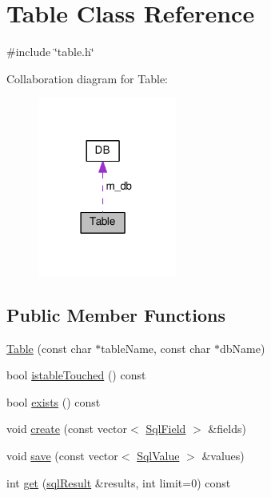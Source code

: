 \hypertarget{classTable}{}\section{Table Class Reference}
\label{classTable}


{\ttfamily \#include \char`\"{}table.\+h\char`\"{}}



Collaboration diagram for Table\+:\nopagebreak
\begin{figure}[H]
\begin{center}
\leavevmode
\includegraphics[width=129pt]{classTable__coll__graph}
\end{center}
\end{figure}
\subsection*{Public Member Functions}
\begin{DoxyCompactItemize}
\item 
\mbox{\hyperlink{classTable_ae35623804222a53627bdcaa9e180640f}{Table}} (const char $\ast$table\+Name, const char $\ast$db\+Name)
\item 
bool \mbox{\hyperlink{classTable_a46bf355769e7691ce79ff4363010dc7e}{istable\+Touched}} () const
\item 
bool \mbox{\hyperlink{classTable_a965f8ad5d716320501d64a121429ce50}{exists}} () const
\item 
void \mbox{\hyperlink{classTable_a861e8d9af1231690429629471fdd652b}{create}} (const vector$<$ \mbox{\hyperlink{structSqlField}{Sql\+Field}} $>$ \&fields)
\item 
void \mbox{\hyperlink{classTable_a4b2f3b62906af3f7548fc1ebd648dfc5}{save}} (const vector$<$ \mbox{\hyperlink{structSqlValue}{Sql\+Value}} $>$ \&values)
\item 
int \mbox{\hyperlink{classTable_af1ce76323b4045b893deaf05f51abfd0}{get}} (\mbox{\hyperlink{db_8h_a356f4bbcc8528145c25584033ef0bcb8}{sql\+Result}} \&results, int limit=0) const
\end{DoxyCompactItemize}

